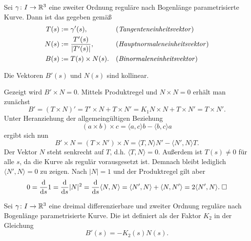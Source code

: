 \begin{definition}
Sei $\gamma\colon I\to\mathbb R^3$ eine zweiter Ordnung reguläre
nach Bogenlänge parametrisierte Kurve. Dann ist das  gegeben gemäß
\begin{align}
T(s) &:= \gamma'(s), && \text{(\emph{Tangenteneinheitsvektor})}\\
N(s) &:= \frac{T'(s)}{|T'(s)|}, && \text{(\emph{Hauptnormaleneinheitsvektor})}\\
B(s) &:= T(s)\times N(s). && \text{(\emph{Binormaleneinheitsvektor})}
\end{align}
\end{definition}

\begin{theorem}\label{Bstrich-kollinear-zu-N}
Die Vektoren $B'(s)$ und $N(s)$ sind kollinear.
\end{theorem}

\noindent{}
Gezeigt wird $B'\times N=0$. Mittels Produktregel und $N\times N=0$
erhält man zunächst%
\begin{equation}
B' = (T\times N)' = T'\times N+T\times N'
= K_1 N\times N + T\times N' = T\times N'.
\end{equation}
Unter Heranziehung der allgemeingültigen Beziehung
\begin{equation}\label{eq:Grassmann-Identitaet}
(a\times b)\times c = \langle a,c\rangle b - \langle b,c\rangle a
\end{equation}
ergibt sich nun
\begin{equation}
B'\times N = (T\times N')\times N
= \langle T,N\rangle N' - \langle N',N\rangle T.
\end{equation}
Der Vektor $N$ steht senkrecht auf $T$, d.h.
$\langle T,N\rangle=0$. Außerdem ist $T(s)\ne 0$ für alle $s$,
da die Kurve als regulär vorausgesetzt ist. Demnach bleibt lediglich
$\langle N',N\rangle=0$ zu zeigen. Nach $|N|=1$ und der Produktregel
gilt aber%
\begin{equation}
0 = \frac{\mathrm d}{\mathrm ds} 1 = \frac{\mathrm d}{\mathrm ds} |N|^2
= \frac{\mathrm d}{\mathrm ds} \langle N,N\rangle
= \langle N',N\rangle + \langle N,N'\rangle
= 2\langle N',N\rangle.\;\Box
\end{equation}


\begin{definition}[Torsion]\label{Torsion}
Sei $\gamma\colon I\to\mathbb R^3$ eine dreimal differenzierbare und
zweiter Ordnung reguläre nach Bogenlänge parametrisierte Kurve.
Die  ist definiert als der Faktor $K_2$ in der Gleichung%
\begin{equation}
B'(s) = -K_2(s)N(s).
\end{equation}
\end{definition}

